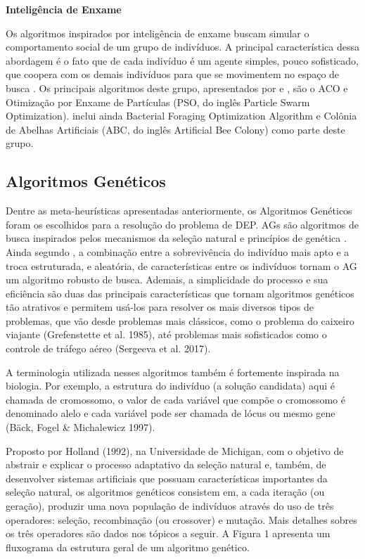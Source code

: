\textbf{Inteligência de Enxame}

Os algoritmos inspirados por inteligência de enxame buscam simular o comportamento social de um grupo de indivíduos. A principal característica dessa abordagem é o fato que de cada indivíduo é um agente simples, pouco sofisticado, que coopera com os demais indivíduos para que se movimentem no espaço de busca \cite{Talbi2009}. Os principais algoritmos deste grupo, apresentados por  e , são o ACO e Otimização por Enxame de Partículas (PSO, do inglês Particle Swarm Optimization).  inclui ainda Bacterial Foraging Optimization Algorithm e Colônia de Abelhas Artificiais (ABC, do inglês Artificial Bee Colony) como parte deste grupo.

\subsection{Algoritmos Genéticos}

Dentre as meta-heurísticas apresentadas anteriormente, os Algoritmos Genéticos foram os escolhidos para a resolução do problema de DEP. AGs são algoritmos de busca inspirados pelos mecanismos da seleção natural e princípios de genética \cite{Goldberg1989}. Ainda segundo , a combinação entre a sobrevivência do indivíduo mais apto e a troca estruturada, e aleatória, de características entre os indivíduos tornam o AG um algoritmo robusto de busca. Ademais, a simplicidade do processo e sua eficiência são duas das principais características que tornam algoritmos genéticos tão atrativos e permitem usá-los para resolver os mais diversos tipos de problemas, que vão desde problemas mais clássicos, como o problema do caixeiro viajante (Grefenstette et al. 1985), até problemas mais sofisticados como o controle de tráfego aéreo (Sergeeva et al. 2017). 

A terminologia utilizada nesses algoritmos também é fortemente inspirada na biologia. Por exemplo, a estrutura do indivíduo (a solução candidata) aqui é chamada de cromossomo, o valor de cada variável que compõe o cromossomo é denominado alelo e cada variável pode ser chamada de lócus ou mesmo gene (Bäck, Fogel \& Michalewicz 1997).

Proposto por Holland (1992), na Universidade de Michigan, com o objetivo de abstrair e explicar o processo adaptativo da seleção natural e, também, de desenvolver sistemas artificiais que possuam características importantes da seleção natural, os algoritmos genéticos consistem em, a cada iteração (ou geração), produzir uma nova população de indivíduos através do uso de três operadores: seleção, recombinação (ou crossover) e mutação. Mais detalhes sobres os três operadores são dados nos tópicos a seguir. A Figura 1 apresenta um fluxograma da estrutura geral de um algoritmo genético. 

